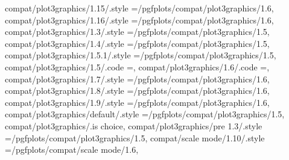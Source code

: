 {{{{{{{{{{{{{{{{{{{compat/plot3graphics/1.15/.style                                   ={/pgfplots/compat/plot3graphics/1.6},                                                                                             
compat/plot3graphics/1.16/.style                                   ={/pgfplots/compat/plot3graphics/1.6},                                                                                             
compat/plot3graphics/1.3/.style                                    ={/pgfplots/compat/plot3graphics/1.5},                                                                                              
compat/plot3graphics/1.4/.style                                    ={/pgfplots/compat/plot3graphics/1.5},                                                                                             
compat/plot3graphics/1.5.1/.style                                  ={/pgfplots/compat/plot3graphics/1.5},                                                                                             
compat/plot3graphics/1.5/.code                                     ={\def\b@pgfplots@compat@plot@graphics@threedim{1}},                                                                               
compat/plot3graphics/1.6/.code                                     ={\def\b@pgfplots@compat@plot@graphics@threedim{2}},                                                                               
compat/plot3graphics/1.7/.style                                    ={/pgfplots/compat/plot3graphics/1.6},                                                                                             
compat/plot3graphics/1.8/.style                                    ={/pgfplots/compat/plot3graphics/1.6},                                                                                             
compat/plot3graphics/1.9/.style                                    ={/pgfplots/compat/plot3graphics/1.6},                                                                                             
compat/plot3graphics/default/.style                                ={/pgfplots/compat/plot3graphics/1.5},                                                                                             
compat/plot3graphics/.is choice,
compat/plot3graphics/pre 1.3/.style                                ={/pgfplots/compat/plot3graphics/1.5},                                                                                              
compat/scale mode/1.10/.style                                      ={/pgfplots/compat/scale mode/1.6},                                                                                                 
}}}}}}}}}}}}}}}}}}}

